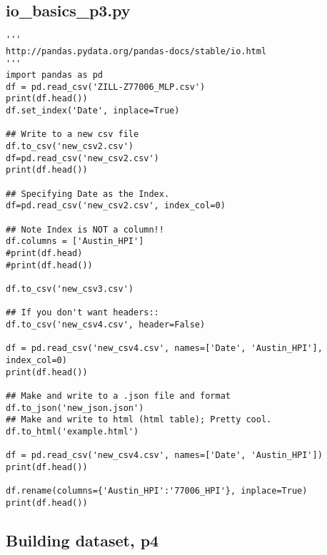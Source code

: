 \documentclass[11pt,a4paper]{article}
\begin{document}
\subsection{io\_basics\_p3.py}

\smallskip
\smallskip
\noindent 
\begin{lstlisting}
'''
http://pandas.pydata.org/pandas-docs/stable/io.html
'''
import pandas as pd
df = pd.read_csv('ZILL-Z77006_MLP.csv')
print(df.head())
df.set_index('Date', inplace=True)

## Write to a new csv file
df.to_csv('new_csv2.csv')
df=pd.read_csv('new_csv2.csv')
print(df.head())

## Specifying Date as the Index.
df=pd.read_csv('new_csv2.csv', index_col=0)

## Note Index is NOT a column!!
df.columns = ['Austin_HPI']
#print(df.head)
#print(df.head())

df.to_csv('new_csv3.csv')

## If you don't want headers::
df.to_csv('new_csv4.csv', header=False)

df = pd.read_csv('new_csv4.csv', names=['Date', 'Austin_HPI'], index_col=0)
print(df.head())

## Make and write to a .json file and format
df.to_json('new_json.json')
## Make and write to html (html table); Pretty cool. 
df.to_html('example.html')

df = pd.read_csv('new_csv4.csv', names=['Date', 'Austin_HPI'])
print(df.head())

df.rename(columns={'Austin_HPI':'77006_HPI'}, inplace=True)
print(df.head())

\end{lstlisting}
\clearpage



\subsection{Building dataset, p4} 
\end{document}
